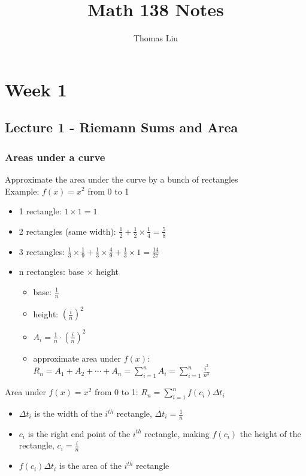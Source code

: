 \documentclass[12pt, letterpaper]{article}
\title{Math 138 Notes}
\author{Thomas Liu}
\begin{document}
\maketitle
\tableofcontents

\newpage

\section{Week 1}
\subsection{Lecture 1 - Riemann Sums and Area}
\subsubsection{Areas under a curve}
Approximate the area under the curve by a bunch of rectangles \\
Example: $f(x) = x^2$ from 0 to 1
\begin{itemize}
    \item 1 rectangle: $1 \times 1 = 1$
    \item 2 rectangles (same width): $\frac{1}{2} + \frac{1}{2}\times\frac{1}{4} = \frac{5}{8}$
    \item 3 rectangles: $\frac{1}{3}\times\frac{1}{9} + \frac{1}{3}\times\frac{4}{9} + \frac{1}{3}\times 1 = \frac{14}{27}$
    \item n rectangles: base $\times$ height
    \begin{itemize}
        \item base: $\frac{1}{n}$
        \item height: $(\frac{i}{n})^2$
        \item $A_i = \frac{1}{n}\cdot(\frac{i}{n})^2$
        \item approximate area under $f(x)$: $R_n = A_1 + A_2 + \cdots + A_n = \displaystyle\sum_{i=1}^{n}A_i = \sum_{i=1}^{n}\frac{i^2}{n^3}$
    \end{itemize} 
\end{itemize}
Area under $f(x) = x^2$ from 0 to 1: $R_n = \displaystyle\sum_{i=1}^{n} f(c_i)\Delta t_i$
\begin{itemize}
    \item $\Delta t_i$ is the width of the $i^{th}$ rectangle, $\Delta t_i = \frac{1}{n}$
    \item $c_i$ is the right end point of the $i^{th}$ rectangle, making $f(c_i)$ the height of the rectangle, $c_i = \frac{i}{n}$
    \item $f(c_i)\Delta t_i$ is the area of the $i^{th}$ rectangle
\end{itemize}
\end{document}
